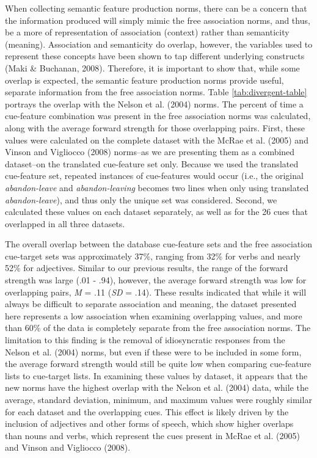 \documentclass[english,,man]{apa6}
\theoremstyle{definition}
\theoremstyle{definition}
\theoremstyle{definition}
\theoremstyle{remark}
\begin{document}
When collecting semantic feature production norms, there can be a
concern that the information produced will simply mimic the free
association norms, and thus, be a more of representation of association
(context) rather than semanticity (meaning). Association and semanticity
do overlap, however, the variables used to represent these concepts have
been shown to tap different underlying constructs (Maki \& Buchanan,
2008). Therefore, it is important to show that, while some overlap is
expected, the semantic feature production norms provide useful, separate
information from the free association norms. Table
\ref{tab:divergent-table} portrays the overlap with the Nelson et al.
(2004) norms. The percent of time a cue-feature combination was present
in the free association norms was calculated, along with the average
forward strength for those overlapping pairs. First, these values were
calculated on the complete dataset with the McRae et al. (2005) and
Vinson and Vigliocco (2008) norms--as we are presenting them as a
combined dataset--on the translated cue-feature set only. Because we
used the translated cue-feature set, repeated instances of cue-features
would occur (i.e., the original \emph{abandon-leave} and
\emph{abandon-leaving} becomes two lines when only using translated
\emph{abandon-leave}), and thus only the unique set was considered.
Second, we calculated these values on each dataset separately, as well
as for the 26 cues that overlapped in all three datasets.

The overall overlap between the database cue-feature sets and the free
association cue-target sets was approximately 37\%, ranging from 32\%
for verbs and nearly 52\% for adjectives. Similar to our previous
results, the range of the forward strength was large (.01 - .94),
however, the average forward strength was low for overlapping pairs,
\emph{M} = .11 (\emph{SD} = .14). These results indicated that while it
will always be difficult to separate association and meaning, the
dataset presented here represents a low association when examining
overlapping values, and more than 60\% of the data is completely
separate from the free association norms. The limitation to this finding
is the removal of idiosyncratic responses from the Nelson et al. (2004)
norms, but even if these were to be included in some form, the average
forward strength would still be quite low when comparing cue-feature
lists to cue-target lists. In examining these values by dataset, it
appears that the new norms have the highest overlap with the Nelson et
al. (2004) data, while the average, standard deviation, minimum, and
maximum values were roughly similar for each dataset and the overlapping
cues. This effect is likely driven by the inclusion of adjectives and
other forms of speech, which show higher overlaps than nouns and verbs,
which represent the cues present in McRae et al. (2005) and Vinson and
Vigliocco (2008).
\end{document}
